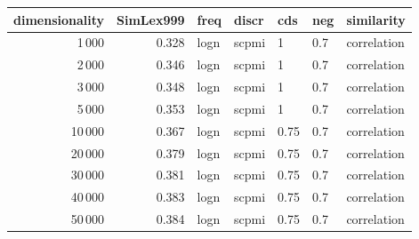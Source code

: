\begin{tabular}{rrlllll}
\toprule
 dimensionality &  SimLex999 &  freq &  discr &   cds &  neg &   similarity \\
\midrule
           1\,000 &      0.328 &  logn &  scpmi &     1 &  0.7 &  correlation \\
           2\,000 &      0.346 &  logn &  scpmi &     1 &  0.7 &  correlation \\
           3\,000 &      0.348 &  logn &  scpmi &     1 &  0.7 &  correlation \\
           5\,000 &      0.353 &  logn &  scpmi &     1 &  0.7 &  correlation \\
          10\,000 &      0.367 &  logn &  scpmi &  0.75 &  0.7 &  correlation \\
          20\,000 &      0.379 &  logn &  scpmi &  0.75 &  0.7 &  correlation \\
          30\,000 &      0.381 &  logn &  scpmi &  0.75 &  0.7 &  correlation \\
          40\,000 &      0.383 &  logn &  scpmi &  0.75 &  0.7 &  correlation \\
          50\,000 &      0.384 &  logn &  scpmi &  0.75 &  0.7 &  correlation \\
\bottomrule
\end{tabular}
